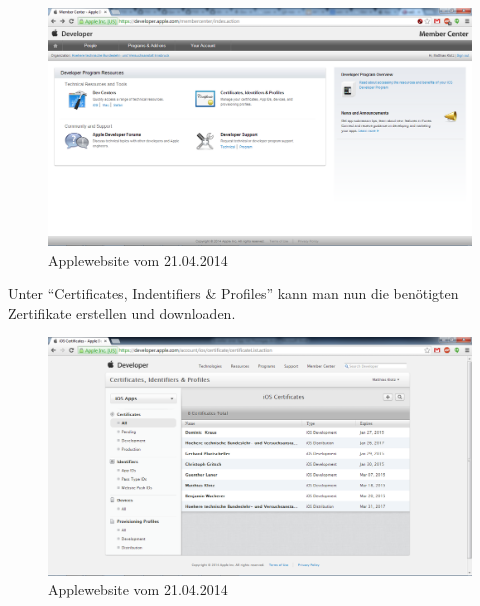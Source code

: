 \begin{figure}[H]
\includegraphics[keepaspectratio=true, width=14cm]{images/phoneGap/AppleMemberCenter1.png}
\caption{Applewebsite vom 21.04.2014}
\end{figure}

Unter \enquote{Certificates, Indentifiers \& Profiles} kann man nun die benötigten Zertifikate erstellen und downloaden.\\

\begin{figure}[H]
\includegraphics[keepaspectratio=true, width=14cm]{images/phoneGap/AppleMemberCenter2.png}
\caption{Applewebsite vom 21.04.2014}
\end{figure}

